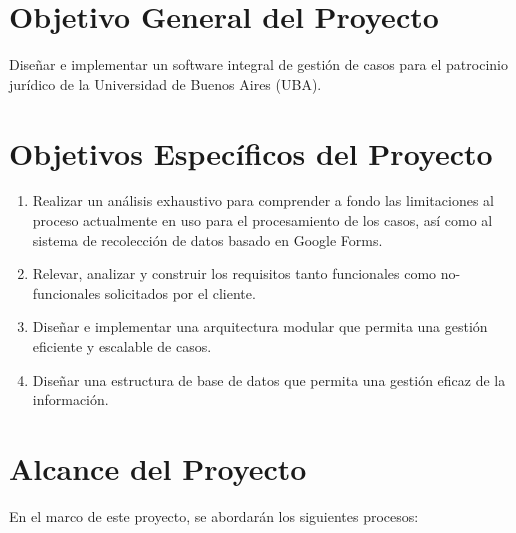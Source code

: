 \section {Objetivo General del Proyecto}
\label{sec:objetivos:generales}
Diseñar e implementar un software integral de gestión de casos para el patrocinio jurídico de la Universidad de Buenos Aires (UBA).

\section {Objetivos Específicos del Proyecto}
\label{sec:objetivos:especificos}

\begin {enumerate}
\item Realizar un análisis exhaustivo para comprender a fondo las limitaciones al proceso actualmente en uso para el procesamiento de los casos, así como al sistema de recolección de datos basado en Google Forms.
\item Relevar, analizar y construir los requisitos tanto funcionales como no-funcionales solicitados por el cliente.
\item Diseñar e implementar una arquitectura modular que permita una gestión eficiente y escalable de casos.
\item Diseñar una estructura de base de datos que permita una gestión eficaz de la información.
\end{enumerate}

\section {Alcance del Proyecto}
\label{sec:alcance}
En el marco de este proyecto, se abordarán los siguientes procesos:

